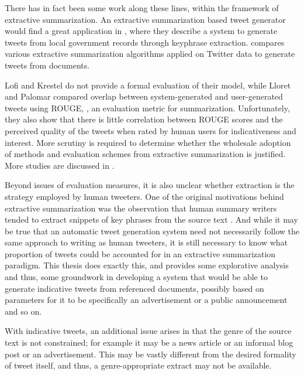 There has in fact been some work along these lines, within the framework of extractive summarization. An extractive summarization based tweet generator would find a great application in \cite{lofi2012iparticipate}, where they describe a system to generate tweets from local government records through keyphrase extraction. \cite{lloret2013towards} compares various extractive summarization algorithms applied on Twitter data to generate tweets from documents. 

Lofi and Krestel do not provide a formal evaluation of their model, while Lloret and Palomar compared overlap between system-generated and user-generated tweets using ROUGE, 
\citep{lin2004rouge}, an evaluation metric for summarization. Unfortunately, they also show that there is little correlation between ROUGE scores and the perceived quality of the tweets when rated by human users for indicativeness and interest. More scrutiny is required to determine whether the wholesale adoption of methods and evaluation schemes from extractive summarization is justified. More studies are discussed in .

Beyond issues of evaluation measures, it is also unclear whether extraction is the strategy employed by human tweeters. One of the original motivations behind extractive summarization was the observation that human summary writers tended to extract snippets of key phrases from the source text \cite{mani-2001}.  And while it may be true that an automatic tweet generation system need not necessarily follow the same approach to writing as human tweeters, it is still necessary to know what proportion of tweets could be accounted for in an extractive summarization paradigm. This thesis does exactly this, and provides some explorative analysis and thus, some groundwork in developing a system that would be able to generate indicative tweets from referenced documents, possibly based on parameters for it to be specifically an advertisement or a public announcement and so on.

With indicative tweets, an additional issue arises in that the genre of the source text is not constrained; for example it may be a news article or an informal blog post or an advertisement. This may be vastly different from the desired formality of tweet itself, and thus, a genre-appropriate extract may not be available.

